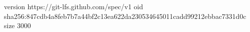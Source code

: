version https://git-lfs.github.com/spec/v1
oid sha256:847cdb4a8feb7b7a44bf2c13ea622da230534645011cadd99212ebbac7331d0c
size 3000
